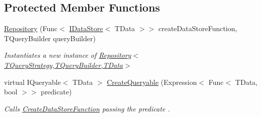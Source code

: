 \subsection*{Protected Member Functions}
\begin{DoxyCompactItemize}
\item 
\hyperlink{classCqrs_1_1Repositories_1_1Repository_a2f4009847fa03a897c6698fd5a92d89f_a2f4009847fa03a897c6698fd5a92d89f}{Repository} (Func$<$ \hyperlink{interfaceCqrs_1_1DataStores_1_1IDataStore}{I\+Data\+Store}$<$ T\+Data $>$$>$ create\+Data\+Store\+Function, T\+Query\+Builder query\+Builder)
\begin{DoxyCompactList}\small\item\em Instantiates a new instance of \hyperlink{classCqrs_1_1Repositories_1_1Repository_a2f4009847fa03a897c6698fd5a92d89f_a2f4009847fa03a897c6698fd5a92d89f}{Repository$<$\+T\+Query\+Strategy,\+T\+Query\+Builder,\+T\+Data$>$} \end{DoxyCompactList}\item 
virtual I\+Queryable$<$ T\+Data $>$ \hyperlink{classCqrs_1_1Repositories_1_1Repository_ab95fc66b24e8359a1e2f48a3ca2f14c1_ab95fc66b24e8359a1e2f48a3ca2f14c1}{Create\+Queryable} (Expression$<$ Func$<$ T\+Data, bool $>$$>$ predicate)
\begin{DoxyCompactList}\small\item\em Calls \hyperlink{classCqrs_1_1Repositories_1_1Repository_ae15cee6394a223564ad2ead65cd30189_ae15cee6394a223564ad2ead65cd30189}{Create\+Data\+Store\+Function} passing the {\itshape predicate} . \end{DoxyCompactList}\end{DoxyCompactItemize}
